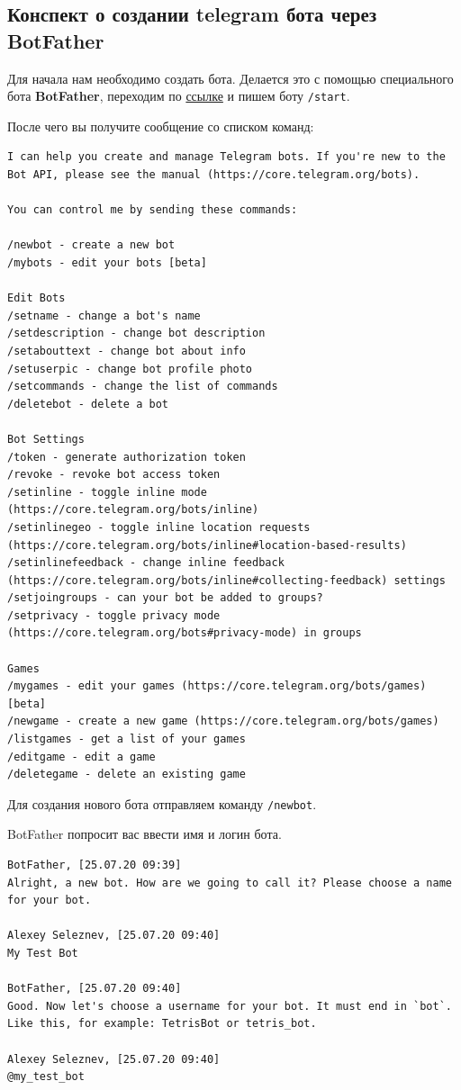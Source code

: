 \documentclass[
]{book}
\begin{document}
\subsection{Конспект о создании telegram бота через BotFather}\label{ux43aux43eux43dux441ux43fux435ux43aux442-ux43e-ux441ux43eux437ux434ux430ux43dux438ux438-telegram-ux431ux43eux442ux430-ux447ux435ux440ux435ux437-botfather}

Для начала нам необходимо создать бота. Делается это с помощью специального бота \textbf{BotFather}, переходим по \href{https://t.me/BotFather}{ссылке} и пишем боту \texttt{/start}.

После чего вы получите сообщение со списком команд:

\begin{verbatim}
I can help you create and manage Telegram bots. If you're new to the Bot API, please see the manual (https://core.telegram.org/bots).

You can control me by sending these commands:

/newbot - create a new bot
/mybots - edit your bots [beta]

Edit Bots
/setname - change a bot's name
/setdescription - change bot description
/setabouttext - change bot about info
/setuserpic - change bot profile photo
/setcommands - change the list of commands
/deletebot - delete a bot

Bot Settings
/token - generate authorization token
/revoke - revoke bot access token
/setinline - toggle inline mode (https://core.telegram.org/bots/inline)
/setinlinegeo - toggle inline location requests (https://core.telegram.org/bots/inline#location-based-results)
/setinlinefeedback - change inline feedback (https://core.telegram.org/bots/inline#collecting-feedback) settings
/setjoingroups - can your bot be added to groups?
/setprivacy - toggle privacy mode (https://core.telegram.org/bots#privacy-mode) in groups

Games
/mygames - edit your games (https://core.telegram.org/bots/games) [beta]
/newgame - create a new game (https://core.telegram.org/bots/games)
/listgames - get a list of your games
/editgame - edit a game
/deletegame - delete an existing game
\end{verbatim}

Для создания нового бота отправляем команду \texttt{/newbot}.

BotFather попросит вас ввести имя и логин бота.

\begin{verbatim}
BotFather, [25.07.20 09:39]
Alright, a new bot. How are we going to call it? Please choose a name for your bot.

Alexey Seleznev, [25.07.20 09:40]
My Test Bot

BotFather, [25.07.20 09:40]
Good. Now let's choose a username for your bot. It must end in `bot`. Like this, for example: TetrisBot or tetris_bot.

Alexey Seleznev, [25.07.20 09:40]
@my_test_bot
\end{verbatim}
\end{document}
